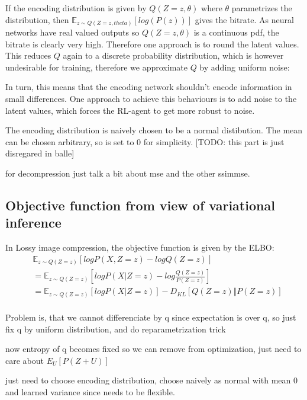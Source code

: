     If the encoding distribution is given by $Q(Z=z, \theta)$ where $\theta$
    parametrizes the distribution, then $\mathbb{E}_{z \sim Q(Z=z,
    theta)}[log(P(z))]$ gives the bitrate. As neural networks have real valued
    outputs so $Q(Z=z, \theta)$ is a continuous pdf, the bitrate is clearly very
    high. Therefore one approach is to round the latent values. This reduces $Q$
    again to a discrete probability distribution, which is however undesirable
    for training, therefore we approximate $Q$ by adding uniform noise:
    
    In turn, this means that the encoding network shouldn't encode information
    in small differences. One approach to achieve this behaviours is to add
    noise to the latent values, which forces the RL-agent to get more robust to
    noise.

    The encoding distribution is naively chosen to be a normal distibution. The
    mean can be chosen arbitrary, so is set to 0 for simplicity. [TODO: this
    part is just disregared in balle]

    for decompression just talk a bit about mse and the other ssimmse.

    
    


\subsection{Objective function from view of variational inference}
    In Lossy image compression, the objective function is given by the ELBO:
    \begin{align}
        & \mathbb{E}_{z \sim Q(Z= z)}[log P(X, Z= z) - log Q(Z = z)]\\
        & = \mathbb{E}_{z \sim Q(Z= z)}[log P(X \vert Z= z) - log \frac{Q(Z = z)}{P(Z = z)}]\\
        & = \mathbb{E}_{z \sim Q(Z= z)}[log P(X \vert Z= z)] - D_{KL}[Q(Z = z)\Vert P(Z = z)]\\
    \end{align}
    
    Problem is, that we cannot differenciate by q since expectation is over q,
    so just fix q by uniform distribution, and do reparametrization trick

    now entropy of q becomes fixed so we can remove from optimization, just need
    to care about $E_U[P(Z + U)]$

    just need to choose encoding distribution, choose naively as normal with
    mean 0 and learned variance since needs to be flexible.

